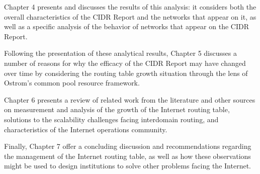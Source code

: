 Chapter 4 presents and discusses the results of this analysis: it considers both the overall characteristics of the CIDR Report and the networks that appear on it, as well as a specific analysis of the behavior of networks that appear on the CIDR Report.

Following the presentation of these analytical results, Chapter 5 discusses a number of reasons for why the efficacy of the CIDR Report may have changed over time by considering the routing table growth situation through the lens of Ostrom's common pool resource framework.

Chapter 6 presents a review of related work from the literature and other sources on measurement and analysis of the growth of the Internet routing table, solutions to the scalability challenges facing interdomain routing, and characteristics of the Internet operations community.

Finally, Chapter 7 offer a concluding discussion and recommendations regarding the management of the Internet routing table, as well as how these observations might be used to design institutions to solve other problems facing the Internet.
